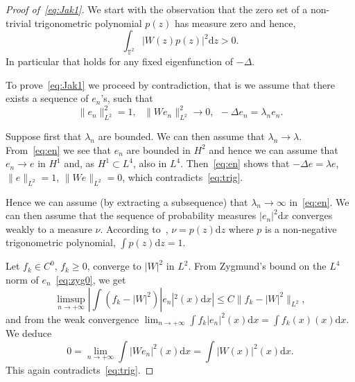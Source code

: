 \documentclass[11pt]{article}
\theoremstyle{definition}
\numberwithin{equation}{section}
\numberwithin{figure}{section}
\numberwithin{table}{section}
\newcommand{\TT}{{\mathbb T}}
\newcommand*{\dd}{\mathrm{d}}
\newcommand*{\dx}{\dd x}
\newcommand*{\dz}{\dd z}
\begin{document}
\begin{proof}[Proof of~\eqref{eq:Jak1}]
We start with the observation that the zero set of a non-trivial trigonometric polynomial $ p (z) $ has measure zero and hence,
\begin{equation}\label{eq:trig}
\int_{\TT^2} | W (z) p(z) |^2 \dz > 0.
\end{equation}
In particular that holds for any fixed eigenfunction of $ - \Delta $.

To prove~\eqref{eq:Jak1} we proceed by contradiction, that is we assume that there exists a sequence of $ e_n $'s, such that
\begin{equation}\label{eq:en}
\|e_n \|_{L^2}^2 = 1, \ \ \ \| W e_n \|_{L^2}^2 \rightarrow 0, \ \ - \Delta e_n =
\lambda_n e_n.
\end{equation}

Suppose first that $ \lambda_n $ are bounded. We can then assume that $ \lambda_n \to \lambda $. From~\eqref{eq:en} we see that $ e_n $ are bounded in $ H^2 $ and hence we can assume that $ e_n \to e $ in $ H^1 $ and, as $ H^1 \subset L^4 $, also in $ L^4 $. Then~\eqref{eq:en} shows that $ -\Delta e = \lambda e$, $ \| e\|_{L^2 } = 1 $, $ \| W e \|_{L^2 } = 0$, which contradicts~\eqref{eq:trig}.

Hence we can assume (by extracting a subsequence) that $ \lambda_n \to \infty $ in~\eqref{eq:en}. We can then assume that the sequence of probability measures $ |e_n|^2 \dx $ converges weakly to a measure $\nu$. According to~\cite[Theorem~1.2]{Jak}, $ \nu = p (z) \dz $ where $ p$ is a non-negative trigonometric polynomial, $ \int p (z) \dz = 1 $.

Let $ f_k\in C^0$, $ f_k \geq 0$, converge to $|W|^2 $ in $L^2$. From Zygmund's bound on the $L^4$ norm of $e_n$~\eqref{eq:zyg0}, we get
\[
\limsup_{n\rightarrow + \infty} | \int (f_k - |W |^2)|e_n|^2 (x) \dx | \leq C \| f_k - |W|^2\|_{L^2},
\]
and from the weak convergence $ \lim_{n\rightarrow + \infty} \int f_k|e_n|^2 (x) \dx = \int f_k (x) (x)\dx.$ We deduce
\[
0= \lim_{n\rightarrow + \infty} \int |W e_n|^2 (x) \dx = \int |W (x)|^2 (x)\dx.
\]
This again contradicts~\eqref{eq:trig}.
\end{proof}
\end{document}
